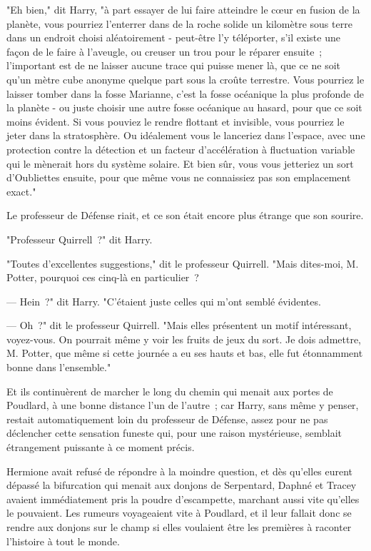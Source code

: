 "Eh bien," dit Harry, "à part essayer de lui faire atteindre le cœur en fusion de la planète, vous pourriez l'enterrer dans de la roche solide un kilomètre sous terre dans un endroit choisi aléatoirement - peut-être l'y téléporter, s'il existe une façon de le faire à l'aveugle, ou creuser un trou pour le réparer ensuite~; l'important est de ne laisser aucune trace qui puisse mener là, que ce ne soit qu'un mètre cube anonyme quelque part sous la croûte terrestre. Vous pourriez le laisser tomber dans la fosse Marianne, c'est la fosse océanique la plus profonde de la planète - ou juste choisir une autre fosse océanique au hasard, pour que ce soit moins évident. Si vous pouviez le rendre flottant et invisible, vous pourriez le jeter dans la stratosphère. Ou idéalement vous le lanceriez dans l'espace, avec une protection contre la détection et un facteur d'accélération à fluctuation variable qui le mènerait hors du système solaire. Et bien sûr, vous vous jetteriez un sort d'Oubliettes ensuite, pour que même vous ne connaissiez pas son emplacement exact."

Le professeur de Défense riait, et ce son était encore plus étrange que son sourire.

"Professeur Quirrell~?" dit Harry.

"Toutes d'excellentes suggestions," dit le professeur Quirrell. "Mais dites-moi, M. Potter, pourquoi ces cinq-là en particulier~?

--- Hein~?" dit Harry. "C'étaient juste celles qui m'ont semblé évidentes.

--- Oh~?" dit le professeur Quirrell. "Mais elles présentent un motif intéressant, voyez-vous. On pourrait même y voir les fruits de jeux du sort. Je dois admettre, M. Potter, que même si cette journée a eu ses hauts et bas, elle fut étonnamment bonne dans l'ensemble."

Et ils continuèrent de marcher le long du chemin qui menait aux portes de Poudlard, à une bonne distance l'un de l'autre~; car Harry, sans même y penser, restait automatiquement loin du professeur de Défense, assez pour ne pas déclencher cette sensation funeste qui, pour une raison mystérieuse, semblait étrangement puissante à ce moment précis.


Hermione avait refusé de répondre à la moindre question, et dès qu'elles eurent dépassé la bifurcation qui menait aux donjons de Serpentard, Daphné et Tracey avaient immédiatement pris la poudre d'escampette, marchant aussi vite qu'elles le pouvaient. Les rumeurs voyageaient vite à Poudlard, et il leur fallait donc se rendre aux donjons sur le champ si elles voulaient être les premières à raconter l'histoire à tout le monde.

